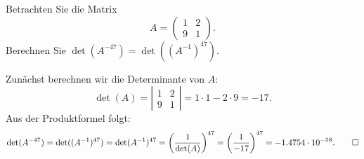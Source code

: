 Betrachten Sie die Matrix
\[
A=\begin{pmatrix}
1&2\\
9&1
\end{pmatrix}.
\]
Berechnen Sie $\det(A^{-47}) = \det((A^{-1})^{47})$.


\begin{loesung}
Zunächst berechnen wir die Determinante von $A$:
\[
\det(A)=
\left|
\begin{matrix}
1&2\\
9&1
\end{matrix}
\right|
=
1\cdot 1 - 2 \cdot 9 = -17.
\]
Aus der Produktformel folgt:
\[
\det(A^{-47}) 
= 
\det((A^{-1})^{47})
=
\det(A^{-1})^{47}
=
\left(\dfrac{1}{\det(A)}\right)^{47}
=
\left(\dfrac{1}{-17}\right)^{47}
=
-1.4754\cdot 10^{-58}.
\qedhere
\]
\end{loesung}





